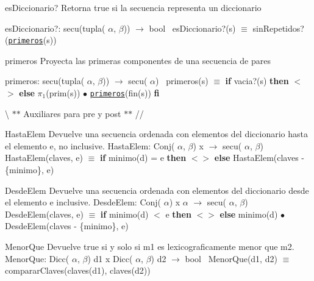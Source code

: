 \begin{DoxyParagraph}{es\+Diccionario?}
Retorna true si la secuencia representa un diccionario

es\+Diccionario?\+: secu(tupla( $\alpha$, $\beta$)) $\to$ bool~\newline
 es\+Diccionario?(s) $\equiv$ sin\+Repetidos?(\href{axiomas.html#primeros}{\tt primeros}(s)) 
\end{DoxyParagraph}


\begin{DoxyParagraph}{primeros}
Proyecta las primeras componentes de una secuencia de pares

primeros\+: secu(tupla( $\alpha$, $\beta$)) $\to$ secu( $\alpha$)~\newline
 primeros(s) $\equiv$ {\bfseries if} vacia?(s) {\bfseries then} $<$$>$ {\bfseries else} $\pi_1$(prim(s)) $\bullet$ \href{axiomas.html#primeros}{\tt primeros}(fin(s)) {\bfseries fi} 
\end{DoxyParagraph}


\textbackslash{} $\ast$$\ast$ Auxiliares para pre y post $\ast$$\ast$ // \begin{DoxyParagraph}{Hasta\+Elem}
Devuelve una secuencia ordenada con elementos del diccionario hasta el elemento e, no inclusive. Hasta\+Elem\+: Conj( $\alpha$, $\beta$) x $\to$ secu( $\alpha$, $\beta$)~\newline
 Hasta\+Elem(claves, e) $\equiv$ {\bfseries if} minimo(d) = e {\bfseries then} $<$$>$ {\bfseries else} Hasta\+Elem(claves -\/ \{minimo\}, e) 
\end{DoxyParagraph}


\begin{DoxyParagraph}{Desde\+Elem}
Devuelve una secuencia ordenada con elementos del diccionario desde el elemento e inclusive. Desde\+Elem\+: Conj( $\alpha$) x $\alpha$ $\to$ secu( $\alpha$, $\beta$)~\newline
 Desde\+Elem(claves, e) $\equiv$ {\bfseries if} minimo(d) $<$ e {\bfseries then} $<$$>$ {\bfseries else} minimo(d) $\bullet$ Desde\+Elem(claves -\/ \{minimo\}, e) 
\end{DoxyParagraph}


\begin{DoxyParagraph}{Menor\+Que}
Devuelve true si y solo si m1 es lexicograficamente menor que m2. Menor\+Que\+: Dicc( $\alpha$, $\beta$) d1 x Dicc( $\alpha$, $\beta$) d2 $\to$ bool~\newline
 Menor\+Que(d1, d2) $\equiv$ comparar\+Claves(claves(d1), claves(d2)) 
\end{DoxyParagraph}


